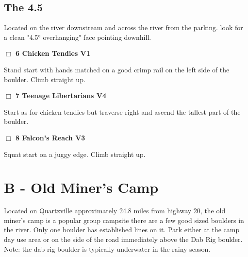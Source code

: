 	\begin{multicols}{2}


\needspace{3em}
\subsection*{The 4.5}\label{bf:The 4.5}
Located on the river downstream and across the river from the parking. look for a clean "4.5° overhanging" face pointing downhill.\\



\needspace{2em}
\label{rt:Chicken Tendies}
\colorbox{green!20}{
\parbox{0.95\linewidth}{
\hspace{-1ex}\textbf{$\Box$
6 Chicken Tendies V1  
}}}
\begin{adjustwidth}{1.3em}{}			
Stand start with hands matched on a good crimp rail on the left side of the boulder. Climb straight up.
\end{adjustwidth}




\needspace{2em}
\label{rt:Teenage Libertarians}
\colorbox{RoyalBlue!20}{
\parbox{0.95\linewidth}{
\hspace{-1ex}\textbf{$\Box$
7 Teenage Libertarians V4  
}}}
\begin{adjustwidth}{1.3em}{}			
Start as for chicken tendies but traverse right and ascend the tallest part of the boulder.
\end{adjustwidth}




\needspace{2em}
\label{rt:Falcon's Reach}
\colorbox{green!20}{
\parbox{0.95\linewidth}{
\hspace{-1ex}\textbf{$\Box$
8 Falcon's Reach V3  
}}}
\begin{adjustwidth}{1.3em}{}			
Squat start on a juggy edge. Climb straight up.
\end{adjustwidth}





\newpage

\section{B - Old Miner's Camp}\label{sa:Old Miner's Camp}
Located on Quartzville approximately 24.8 miles from highway 20, the old miner's camp is a popular group campsite there are a few good sized boulders in the river. Only one boulder has established lines on it. Park either at the camp day use area or on the side of the road immediately above the Dab Rig boulder. Note: the dab rig boulder is typically underwater in the rainy season.\\





\end{multicols}

